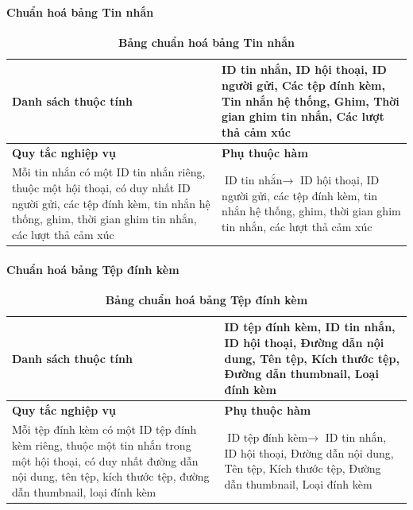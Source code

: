 \paragraph{Chuẩn hoá bảng Tin nhắn}
\mbox{}
\begin{table}[H]
  \caption{\bfseries \fontsize{12pt}{0pt}\selectfont Bảng chuẩn hoá bảng Tin nhắn}
  \centering
  \begin{tabularx}{0.9\textwidth}{|X|X|}
    \hline
    \textbf{Danh sách thuộc tính} & ID tin nhắn, ID hội thoại, ID người gửi, Các tệp đính kèm, 
    Tin nhắn hệ thống, Ghim, Thời gian ghim tin nhắn, Các lượt thả cảm xúc \\
    \hline
    \textbf{Quy tắc nghiệp vụ} & \textbf{Phụ thuộc hàm} \\
    \hline
    Mỗi tin nhắn có một ID tin nhắn riêng, thuộc một hội thoại, có duy nhất ID người gửi, các tệp đính kèm,
    tin nhắn hệ thống, ghim, thời gian ghim tin nhắn, các lượt thả cảm xúc
    & \parbox[t]{\linewidth}{$\text{ID tin nhắn} \rightarrow$ ID hội thoại, ID người gửi, các tệp đính kèm,
    tin nhắn hệ thống, ghim, thời gian ghim tin nhắn, các lượt thả cảm xúc} \\
    \hline
     \\
     \\
    \hline
  \end{tabularx}
\end{table}

\paragraph{Chuẩn hoá bảng Tệp đính kèm}
\mbox{}
\begin{table}[H]
  \caption{\bfseries \fontsize{12pt}{0pt}\selectfont Bảng chuẩn hoá bảng Tệp đính kèm}
  \centering
  \begin{tabularx}{0.9\textwidth}{|X|X|}
    \hline
    \textbf{Danh sách thuộc tính} & ID tệp đính kèm, ID tin nhắn, ID hội thoại, Đường dẫn nội
    dung, Tên tệp, Kích thước tệp, Đường dẫn thumbnail, Loại đính kèm \\
    \hline
    \textbf{Quy tắc nghiệp vụ} & \textbf{Phụ thuộc hàm} \\
    \hline
    Mỗi tệp đính kèm có một ID tệp đính kèm riêng, thuộc một tin nhắn trong một hội thoại, có duy nhất đường dẫn nội
    dung, tên tệp, kích thước tệp, đường dẫn thumbnail, loại đính kèm
    & \parbox[t]{\linewidth}{$\text{ID tệp đính kèm} \rightarrow$ ID tin nhắn, ID hội thoại, Đường dẫn nội
    dung, Tên tệp, Kích thước tệp, Đường dẫn thumbnail, Loại đính kèm} \\
    \hline
     \\
     \\
    \hline
  \end{tabularx}
\end{table}

